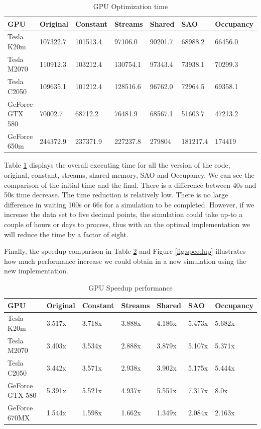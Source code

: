 \begin{table}[h]
\centering
  \begin{tabular} { |  l  |  l | l  |  l  | l | l | l |}
    \hline
    GPU & Original & Constant & Streams & Shared & SAO & Occupancy \\
    \hline
    Tesla K20m & 107322.7 & 101513.4 & 97106.0 & 90201.7 & 68988.2 & 66456.0\\
   \hline
    Tesla M2070 & 110912.3 & 103212.4 & 130754.1 & 97343.4 & 73938.1 & 70299.3\\
    \hline
    Tesla C2050 & 109635.1 & 101212.4 & 128516.6 & 96762.0 & 72964.5 & 69358.1\\
   \hline
    GeForce GTX 580 & 70002.7 & 68712.2 & 76481.9 & 68567.1 & 51603.7 & 47213.2\\
   \hline
    GeForce 650m & 244372.9 & 237371.9 & 227237.8 & 279804 & 181217.4 & 174419\\
   \hline
  \end{tabular}
    \caption{GPU Optimization time}
  \label{tab:time}
  \end{table}
  
  Table \ref{tab:time} displays the overall executing time for all the version of the code, original, constant, streams, shared memory, SAO and Occupancy. We can see the comparison of the initial time and the final. There is a difference between 40s and 50s time decrease. The time reduction is relatively low. There is no large difference in waiting 100s or 66s for a simulation to be completed. However, if we increase the data set to five decimal points, the simulation could take up-to a couple of hours or days to process, thus with an the optimal implementation we will reduce the time by a factor of eight.
  
  Finally, the speedup comparison in Table \ref{tab:speed} and Figure \ref{fig:speedup} illustrates how much performance increase we could obtain in a new simulation using the new implementation.
  
  \begin{table}[h]
\centering
  \begin{tabular} { |  l  |  l | l  |  l  | l | l | l |}
    \hline
    GPU & Original & Constant & Streams & Shared & SAO & Occupancy\\
    \hline
    Tesla K20m & 3.517x & 3.718x & 3.888x & 4.186x & 5.473x & 5.682x\\
   \hline
    Tesla M2070 & 3.403x & 3.534x & 2.888x & 3.879x & 5.107x & 5.371x\\
    \hline
    Tesla C2050 & 3.442x & 3.571x & 2.938x & 3.902x & 5.175x & 5.444x\\
   \hline
    GeForce GTX 580 & 5.391x & 5.521x & 4.937x & 5.551x & 7.317x & 8.0x\\
   \hline
    GeForce 670MX & 1.544x & 1.598x & 1.662x & 1.349x & 2.084x & 2.163x\\
   \hline
  \end{tabular}
    \caption{GPU Speedup performance}
  \label{tab:speed}
  \end{table}

